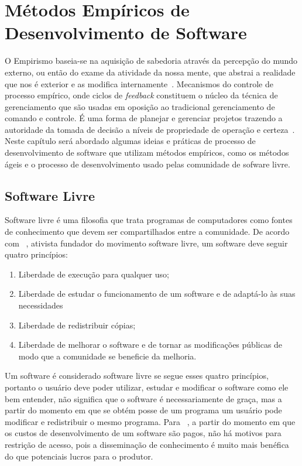 \chapter{Métodos Empíricos de Desenvolvimento de Software}
\label{cap:desenvolvimento-empirico}

O Empirismo baseia-se na aquisição de sabedoria através da percepção do mundo 
externo, ou então do exame da atividade da nossa mente, que abstrai a realidade 
que nos é exterior e as modifica internamente~\cite{chaui2003}.
%
Mecanismos do controle de processo empírico, onde ciclos de \emph{feedback} constituem o
núcleo da técnica de gerenciamento que são usadas em oposição ao tradicional 
gerenciamento de comando e controle.
%
É uma forma de planejar e gerenciar projetos 
trazendo a autoridade da tomada de decisão a níveis de propriedade de operação e 
certeza~\cite{Schwaber2004}.
%
Neste capítulo será abordado algumas ideias e práticas de processo de desenvolvimento
de software que utilizam métodos empíricos, como os métodos ágeis e o processo
de desenvolvimento usado pelas comunidade de sofware livre.
%
\section{Software Livre}

Software livre é uma filosofia que trata programas de computadores como fontes de 
conhecimento que devem ser compartilhados entre a comunidade.
%
De acordo com ~, ativista fundador do movimento software livre, um software deve seguir quatro princípios:
%
\begin{enumerate}
\item Liberdade de execução para qualquer uso;
\item Liberdade de estudar o funcionamento de um software e de adaptá-lo às suas 
necessidades
\item Liberdade de redistribuir cópias;
\item Liberdade de melhorar o software e de tornar as modificações públicas de modo 
que a comunidade se beneficie da melhoria.
\end{enumerate}
%
Um software é considerado software livre se segue esses quatro princípios, portanto 
o usuário deve poder utilizar, estudar e modificar o software como ele bem entender, 
não significa que o software é necessariamente de graça, mas a partir do momento em 
que se obtém posse de um programa um usuário pode modificar e redistribuir o mesmo 
programa.
%
Para ~, a partir do momento em que os custos de desenvolvimento de um software são pagos, não há motivos para restrição de acesso, pois a disseminação de conhecimento é muito mais benéfica do que potenciais lucros para o produtor.

